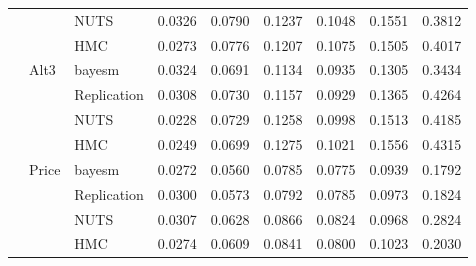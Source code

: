 \begin{tabular}{lllcccccc}
 &  & NUTS & 0.0326 & 0.0790 & 0.1237 & 0.1048 & 0.1551 & 0.3812 \\
 &  & HMC & 0.0273 & 0.0776 & 0.1207 & 0.1075 & 0.1505 & 0.4017 \\
 & Alt3 & bayesm & 0.0324 & 0.0691 & 0.1134 & 0.0935 & 0.1305 & 0.3434 \\
 &  & Replication & 0.0308 & 0.0730 & 0.1157 & 0.0929 & 0.1365 & 0.4264 \\
 &  & NUTS & 0.0228 & 0.0729 & 0.1258 & 0.0998 & 0.1513 & 0.4185 \\
 &  & HMC & 0.0249 & 0.0699 & 0.1275 & 0.1021 & 0.1556 & 0.4315 \\
 & Price & bayesm & 0.0272 & 0.0560 & 0.0785 & 0.0775 & 0.0939 & 0.1792 \\
 &  & Replication & 0.0300 & 0.0573 & 0.0792 & 0.0785 & 0.0973 & 0.1824 \\
 &  & NUTS & 0.0307 & 0.0628 & 0.0866 & 0.0824 & 0.0968 & 0.2824 \\
 &  & HMC & 0.0274 & 0.0609 & 0.0841 & 0.0800 & 0.1023 & 0.2030 \\
\bottomrule
\end{tabular}
